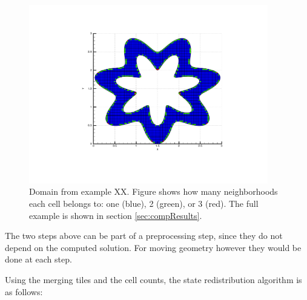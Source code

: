 \begin{figure}[h!]
\begin{center}
\includegraphics[width=4.1in]{figs/wavyfig.pdf}
\caption{\sf Domain from example XX.  Figure shows how many
neighborhoods each cell belongs to: 
one (blue), 2 (green), or 3 (red).
The full example is shown in section \ref{sec:compResults}.}
\label{fig:2nborTile}
\end{center}
\end{figure}

The two steps above can be part of a preprocessing step, since they do not
depend on the computed solution. For moving geometry however they would
be done at each step.

Using the merging tiles and the cell counts, the state redistribution
algorithm is as follows:

